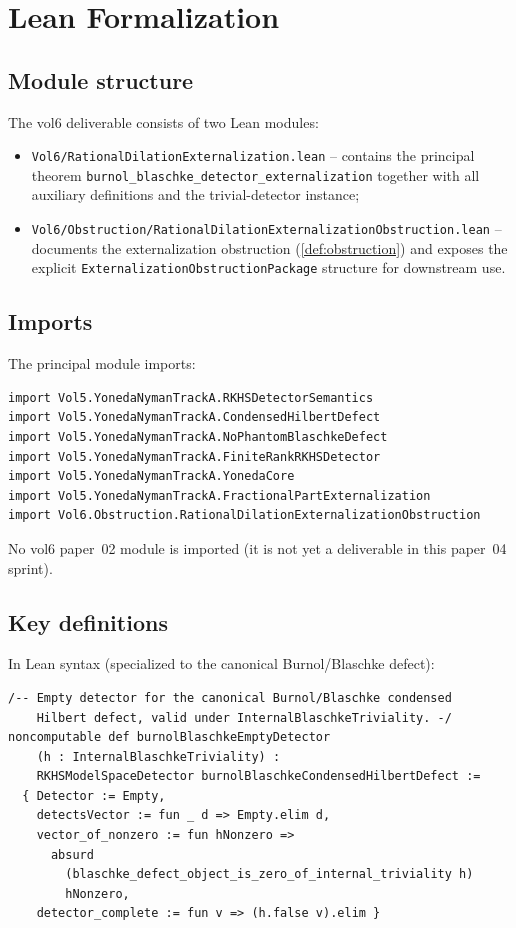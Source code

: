 \documentclass[12pt]{article}
\theoremstyle{plain}
\theoremstyle{definition}
\theoremstyle{remark}
\begin{document}
\section{Lean Formalization}
\label{sec:lean}

\subsection{Module structure}

The vol6 deliverable consists of two Lean modules:
\begin{itemize}
  \item \texttt{Vol6/RationalDilationExternalization.lean} -- contains
    the principal theorem
    \texttt{burnol\_blaschke\_detector\_externalization} together
    with all auxiliary definitions and the trivial-detector
    instance;
  \item \texttt{Vol6/Obstruction/RationalDilationExternalizationObstruction.lean}
    -- documents the externalization obstruction
    (\cref{def:obstruction}) and exposes the explicit
    \texttt{ExternalizationObstructionPackage} structure for
    downstream use.
\end{itemize}

\subsection{Imports}

The principal module imports:
\begin{verbatim}
import Vol5.YonedaNymanTrackA.RKHSDetectorSemantics
import Vol5.YonedaNymanTrackA.CondensedHilbertDefect
import Vol5.YonedaNymanTrackA.NoPhantomBlaschkeDefect
import Vol5.YonedaNymanTrackA.FiniteRankRKHSDetector
import Vol5.YonedaNymanTrackA.YonedaCore
import Vol5.YonedaNymanTrackA.FractionalPartExternalization
import Vol6.Obstruction.RationalDilationExternalizationObstruction
\end{verbatim}
No vol6 paper~02 module is imported (it is not yet a deliverable in
this paper~04 sprint).

\subsection{Key definitions}

In Lean syntax (specialized to the canonical Burnol/Blaschke defect):

\begin{verbatim}
/-- Empty detector for the canonical Burnol/Blaschke condensed
    Hilbert defect, valid under InternalBlaschkeTriviality. -/
noncomputable def burnolBlaschkeEmptyDetector
    (h : InternalBlaschkeTriviality) :
    RKHSModelSpaceDetector burnolBlaschkeCondensedHilbertDefect :=
  { Detector := Empty,
    detectsVector := fun _ d => Empty.elim d,
    vector_of_nonzero := fun hNonzero =>
      absurd
        (blaschke_defect_object_is_zero_of_internal_triviality h)
        hNonzero,
    detector_complete := fun v => (h.false v).elim }
\end{verbatim}
\end{document}
